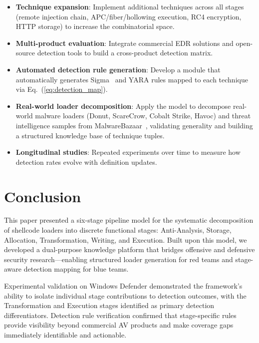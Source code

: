 \documentclass[10pt,a4paper,twocolumn]{article}
\begin{document}
\begin{itemize}[leftmargin=*, itemsep=2pt]
    \item \textbf{Technique expansion}: Implement additional techniques across all stages (remote injection chain, APC/fiber/hollowing execution, RC4 encryption, HTTP storage) to increase the combinatorial space.

    \item \textbf{Multi-product evaluation}: Integrate commercial EDR solutions and open-source detection tools to build a cross-product detection matrix.

    \item \textbf{Automated detection rule generation}: Develop a module that automatically generates Sigma~\cite{sigma} and YARA rules mapped to each technique via Eq.~(\ref{eq:detection_map}).

    \item \textbf{Real-world loader decomposition}: Apply the model to decompose real-world malware loaders (Donut, ScareCrow, Cobalt Strike, Havoc) and threat intelligence samples from MalwareBazaar~\cite{malwarebazaar}, validating generality and building a structured knowledge base of technique tuples.

    \item \textbf{Longitudinal studies}: Repeated experiments over time to measure how detection rates evolve with definition updates.
\end{itemize}

\section{Conclusion}

This paper presented a six-stage pipeline model for the systematic decomposition of shellcode loaders into discrete functional stages: Anti-Analysis, Storage, Allocation, Transformation, Writing, and Execution.
Built upon this model, we developed a dual-purpose knowledge platform that bridges offensive and defensive security research---enabling structured loader generation for red teams and stage-aware detection mapping for blue teams.

Experimental validation on Windows Defender demonstrated the framework's ability to isolate individual stage contributions to detection outcomes, with the Transformation and Execution stages identified as primary detection differentiators.
Detection rule verification confirmed that stage-specific rules provide visibility beyond commercial AV products and make coverage gaps immediately identifiable and actionable.
\end{document}
